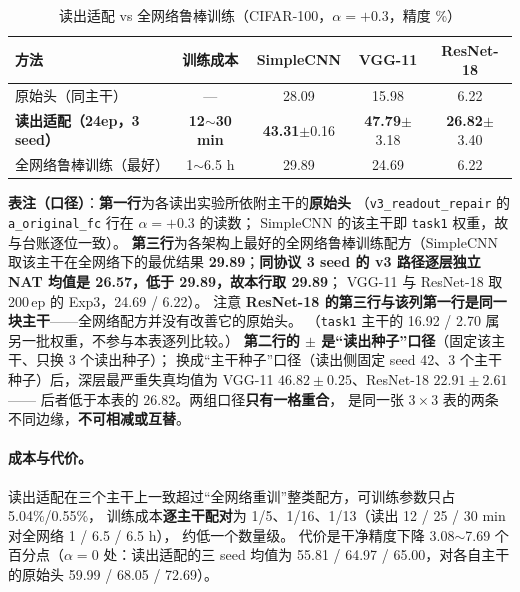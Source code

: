 \documentclass[11pt,a4paper]{ctexart}
\begin{document}
\begin{table}[t]
\centering
\caption{读出适配 vs 全网络鲁棒训练（CIFAR-100，$\alpha=+0.3$，精度 \%）}
\label{tab:nat}
\small
\begin{tabular}{lcccc}
\toprule
方法 & 训练成本 & SimpleCNN & VGG-11 & ResNet-18 \\
\midrule
原始头（同主干） & --- & 28.09 & 15.98 & 6.22 \\
\textbf{读出适配（24ep，3 seed）} & \textbf{12$\sim$30 min} & \textbf{43.31}$\pm$0.16 & \textbf{47.79}$\pm$3.18 & \textbf{26.82}$\pm$3.40 \\
全网络鲁棒训练（最好） & 1$\sim$6.5 h & 29.89 & 24.69 & 6.22 \\
\bottomrule
\end{tabular}

\vspace{3pt}
\begin{minipage}{0.94\textwidth}
\footnotesize
\textbf{表注（口径）}：\textbf{第一行}为各读出实验所依附主干的\textbf{原始头}
（\texttt{v3\_readout\_repair} 的 \texttt{a\_original\_fc} 行在 $\alpha=+0.3$ 的读数；
SimpleCNN 的该主干即 \texttt{task1} 权重，故与台账逐位一致）。
\textbf{第三行}为各架构上最好的全网络鲁棒训练配方（SimpleCNN 取该主干在全网络下的最优结果
\textbf{29.89}；\textbf{同协议 3 seed 的 v3 路径逐层独立 NAT 均值是 26.57，低于 29.89，故本行取 29.89}；
VGG-11 与 ResNet-18 取 200\,ep 的 Exp3，24.69 / 6.22）。
注意 \textbf{ResNet-18 的第三行与该列第一行是同一块主干}——全网络配方并没有改善它的原始头。
（\texttt{task1} 主干的 16.92 / 2.70 属另一批权重，不参与本表逐列比较。）
\textbf{第二行的 $\pm$ 是“读出种子”口径}（固定该主干、只换 3 个读出种子）；
换成“主干种子”口径（读出侧固定 seed 42、3 个主干种子）后，深层最严重失真均值为
VGG-11 $46.82\pm0.25$、ResNet-18 $22.91\pm2.61$——
后者低于本表的 $26.82$。两组口径\textbf{只有一格重合}，
是同一张 $3\times3$ 表的两条不同边缘，\textbf{不可相减或互替}。
\end{minipage}
\end{table}

\paragraph{成本与代价。}
读出适配在三个主干上一致超过“全网络重训”整类配方，可训练参数只占 5.04\%/0.55\%，
训练成本\textbf{逐主干配对}为 1/5、1/16、1/13（读出 12 / 25 / 30 min 对全网络 1 / 6.5 / 6.5 h），
约低一个数量级。
代价是干净精度下降 3.08$\sim$7.69 个百分点（$\alpha=0$ 处：读出适配的三 seed 均值为
55.81 / 64.97 / 65.00，对各自主干的原始头 59.99 / 68.05 / 72.69）。
\end{document}
